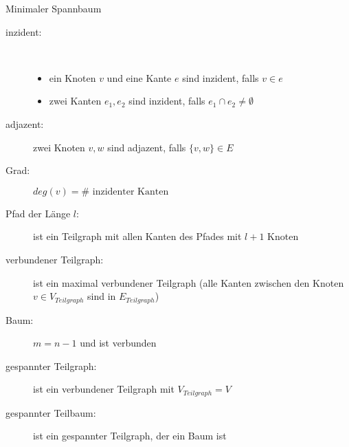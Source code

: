 \begin{TOP}{Minimaler Spannbaum}
\up\up
\begin{description}
	\item[inzident:]\ \\\up
		\begin{itemize}
			\item ein Knoten $v$ und eine Kante $e$ sind inzident, falls $v \in e$
			\item zwei Kanten $e_1,e_2$ sind inzident, falls $e_1 \cap e_2 \neq \emptyset$
		\end{itemize}		
	\item[adjazent:] zwei Knoten $v,w$ sind adjazent, falls $\{v,w\}\in E$
	\item[Grad:] $deg(v)= \#\text{ inzidenter Kanten}$
	\item[Pfad der Länge $l$:] ist ein Teilgraph mit allen Kanten des Pfades mit $l+1$ Knoten
	\item[verbundener Teilgraph:] ist ein maximal verbundener Teilgraph (alle Kanten zwischen den Knoten $v \in V_{Teilgraph}$ sind in $E_{Teilgraph}$)
	\item[Baum:] $m=n-1$ und ist verbunden
	\item[gespannter Teilgraph:] ist ein verbundener Teilgraph mit $V_{Teilgraph}=V$
	\item[gespannter Teilbaum:] ist ein gespannter Teilgraph, der ein Baum ist
\end{description}\ \\
\end{TOP}